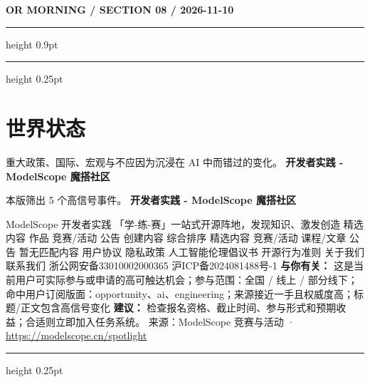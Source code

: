 \documentclass[10.5pt]{ctexart}
\begin{document}
\newpage
{\small\bfseries OR MORNING / SECTION 08 / 2026-11-10}
\vspace{2mm}
\hrule height 0.9pt
\vspace{1.5mm}
\hrule height 0.25pt
\vspace{4mm}
\section*{世界状态}
{\color{ormuted} 重大政策、国际、宏观与不应因为沉浸在 AI 中而错过的变化。}
\vspace{2mm}
{\LARGE\bfseries 开发者实践 - ModelScope 魔搭社区}\par
\vspace{1mm}
{\color{ormuted} 本版筛出 5 个高信号事件。}
\vspace{3mm}
{\Large\bfseries 开发者实践 - ModelScope 魔搭社区}\par
ModelScope 开发者实践 「学-练-赛」一站式开源阵地，发现知识、激发创造 精选内容 作品 竞赛/活动 公告 创建内容 综合排序 精选内容 竞赛/活动 课程/文章 公告 暂无匹配内容 用户协议 隐私政策 人工智能伦理倡议书 开源行为准则 关于我们 联系我们 浙公网安备33010002000365 沪ICP备2024081488号-1
\textbf{与你有关：} 这是当前用户可实际参与或申请的高可触达机会；参与范围：全国 / 线上 / 部分线下；命中用户订阅版面：opportunity、ai、engineering；来源接近一手且权威度高；标题/正文包含高信号变化
\textbf{建议：} 检查报名资格、截止时间、参与形式和预期收益；合适则立即加入任务系统。
{\footnotesize\color{ormuted} 来源：ModelScope 竞赛与活动 · \url{https://modelscope.cn/spotlight}}
\vspace{4mm}
\hrule height 0.25pt
\vspace{3mm}
\end{document}
